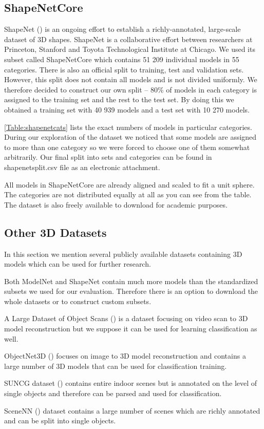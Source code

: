 \subsection{ShapeNetCore}
\label{sec:shapenetcore}
ShapeNet (\cite{chang_shapenet:_2015}) is an ongoing effort to establish a richly-annotated, large-scale dataset of 3D shapes. ShapeNet is a collaborative effort between researchers at Princeton, Stanford and Toyota Technological Institute at Chicago. We used its subset called ShapeNetCore which contains 51 209 individual models in 55 categories. There is also an official split to training, test and validation sets. However, this split does not contain all models and is not divided uniformly. We therefore decided to construct our own split -- 80\% of models in each category is assigned to the training set and the rest to the test set. By doing this we obtained a training set with 40 939 models and a test set with 10 270 models. \par \autoref{Table:shapenetcats} lists the exact numbers of models in particular categories. During our exploration of the dataset we noticed that some models are assigned to more than one category so we were forced to choose one of them somewhat arbitrarily. Our final split into sets and categories can be found in shapenetsplit.csv file as an electronic attachment.\par



All models in ShapeNetCore are already aligned and scaled to fit a unit sphere. The categories are not distributed equally at all as you can see from the table. The dataset is also freely available to download for academic purposes.




\subsection{Other 3D Datasets}
In this section we mention several publicly available datasets containing 3D models which can be used for further research. \par
Both ModelNet and ShapeNet contain much more models than the standardized subsets we used for our evaluation. Therefore there is an option to download the whole datasets or to construct custom subsets. \par
A Large Dataset of Object Scans (\cite{choi_large_2016}) is a dataset focusing on video scan to 3D model reconstruction but we suppose it can be used for learning classification as well.  \par
ObjectNet3D (\cite{xiang_objectnet3d:_2016}) focuses on image to 3D model reconstruction and contains a large number of 3D models that can be used for classification training.\par
SUNCG dataset (\cite{song_semantic_2017}) contains entire indoor scenes but is annotated on the level of single objects and therefore can be parsed and used for classification. \par
SceneNN (\cite{hua_scenenn:_2016}) dataset contains a large number of scenes which are richly annotated and can be split into single objects.

